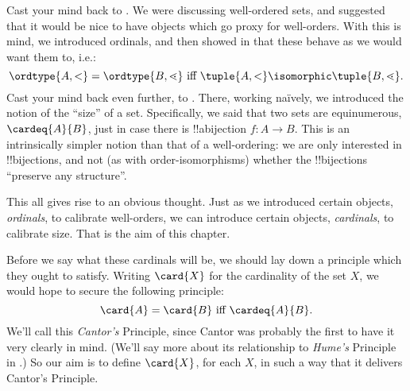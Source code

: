 \documentclass[../../../include/open-logic-section]{subfiles}
\begin{document}

Cast your mind back to . We were discussing
well-ordered sets, and suggested that it would be nice to have objects
which go proxy for well-orders. With this is mind, we introduced
ordinals, and then showed in
 that these
behave as we would want them to, i.e.:
\[
	\ordtype{A, <} = \ordtype{B, \lessdot} 
	\text{ iff } \tuple{A, <} \isomorphic \tuple{B, \lessdot}.
\]
Cast your mind back even further, to .
There, working na\"ively, we introduced the notion of the ``size'' of
a set. Specifically, we said that two sets are equinumerous,
$\cardeq{A}{B}$, just in case there is !!a{bijection} $f \colon A \to
B$. This is an intrinsically {simpler} notion than that of a
well-ordering: we are only interested in !!{bijection}s, and not (as
with order-isomorphisms) whether the !!{bijection}s ``preserve any
structure''.

This all gives rise to an obvious thought. Just as we introduced
certain objects, \emph{ordinals}, to calibrate well-orders, we can
introduce certain objects, \emph{cardinals}, to calibrate size. That
is the aim of this chapter. 

Before we say what these cardinals will be, we should lay down a
principle which they ought to satisfy. Writing $\card{X}$ for the
cardinality of the set $X$, we would hope to secure the following
principle:
\[
	\card{A} = \card{B} \text{ iff } \cardeq{A}{B}.
\]
We'll call this \emph{Cantor's} Principle, since Cantor was probably
the first to have it very clearly in mind. (We'll say more about its
relationship to \emph{Hume's} Principle in .) So
our aim is to define $\card{X}$, for each $X$, in such a way that it
delivers Cantor's Principle.
\end{document}
